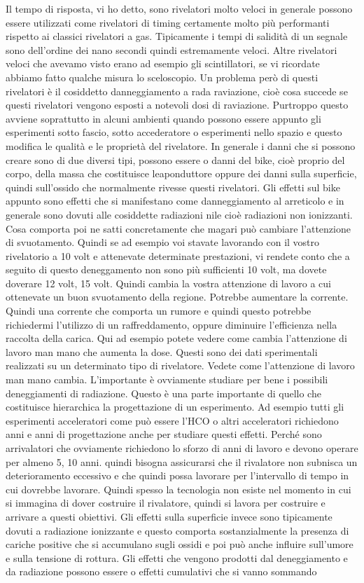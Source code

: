 Il tempo di risposta, vi ho detto, sono rivelatori molto veloci in generale possono essere utilizzati come rivelatori di timing certamente molto più performanti rispetto ai classici rivelatori a gas. Tipicamente i tempi di salidità di un segnale sono dell'ordine dei nano secondi quindi estremamente veloci. Altre rivelatori veloci che avevamo visto erano ad esempio gli scintillatori, se vi ricordate abbiamo fatto qualche misura lo sceloscopio. Un problema però di questi rivelatori è il cosiddetto danneggiamento a rada raviazione, cioè cosa succede se questi rivelatori vengono esposti a notevoli dosi di raviazione. Purtroppo questo avviene soprattutto in alcuni ambienti quando possono essere appunto gli esperimenti sotto fascio, sotto accederatore o esperimenti nello spazio e questo modifica le qualità e le proprietà del rivelatore. In generale i danni che si possono creare sono di due diversi tipi, possono essere o danni del bike, cioè proprio del corpo, della massa che costituisce leaponduttore oppure dei danni sulla superficie, quindi sull'ossido che normalmente rivesse questi rivelatori. Gli effetti sul bike appunto sono effetti che si manifestano come danneggiamento al arreticolo e in generale sono dovuti alle cosiddette radiazioni nile cioè radiazioni non ionizzanti. Cosa comporta poi ne satti concretamente che magari può cambiare l'attenzione di svuotamento. Quindi se ad esempio voi stavate lavorando con il vostro rivelatorio a 10 volt e attenevate determinate prestazioni, vi rendete conto che a seguito di questo deneggamento non sono più sufficienti 10 volt, ma dovete doverare 12 volt, 15 volt. Quindi cambia la vostra attenzione di lavoro a cui ottenevate un buon svuotamento della regione. Potrebbe aumentare la corrente. Quindi una corrente che comporta un rumore e quindi questo potrebbe richiedermi l'utilizzo di un raffreddamento, oppure diminuire l'efficienza nella raccolta della carica. Qui ad esempio potete vedere come cambia l'attenzione di lavoro man mano che aumenta la dose. Questi sono dei dati sperimentali realizzati su un determinato tipo di rivelatore. Vedete come l'attenzione di lavoro man mano cambia. L'importante è ovviamente studiare per bene i possibili deneggiamenti di radiazione. Questo è una parte importante di quello che costituisce hierarchica la progettazione di un esperimento. Ad esempio tutti gli esperimenti acceleratori come può essere l'HCO o altri acceleratori richiedono anni e anni di progettazione anche per studiare questi effetti. Perché sono arrivalatori che ovviamente richiedono lo sforzo di anni di lavoro e devono operare per almeno 5, 10 anni. quindi bisogna assicurarsi che il rivalatore non subnisca un deterioramento eccessivo e che quindi possa lavorare per l'intervallo di tempo in cui dovrebbe lavorare. Quindi spesso la tecnologia non esiste nel momento in cui si immagina di dover costruire il rivalatore, quindi si lavora per costruire e arrivare a questi obiettivi. Gli effetti sulla superficie invece sono tipicamente dovuti a radiazione ionizzante e questo comporta sostanzialmente la presenza di cariche positive che si accumulano sugli ossidi e poi può anche influire sull'umore e sulla tensione di rottura. Gli effetti che vengono prodotti dal deneggiamento e da radiazione possono essere o effetti cumulativi che si vanno sommando 